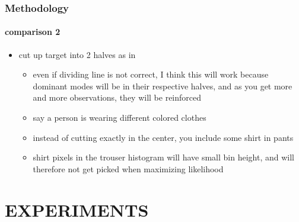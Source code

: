 \begin{frame}
\frametitle{Methodology}
\framesubtitle{comparison 2}
\mypagenum
	\begin{itemize}
		\item cut up target into 2 halves as in 		
			\begin{itemize}
				\item even if dividing line is not correct, I think this will work because dominant modes will be in their respective halves, and as you get more and more observations, they will be reinforced
				\item say a person is wearing different colored clothes
				\item instead of cutting exactly in the center, you include some shirt in pants
				\item shirt pixels in the trouser histogram will have small bin height, and will therefore not get picked when maximizing likelihood
			\end{itemize}
	\end{itemize}
\end{frame}


\section{EXPERIMENTS}



\printbibliography
































